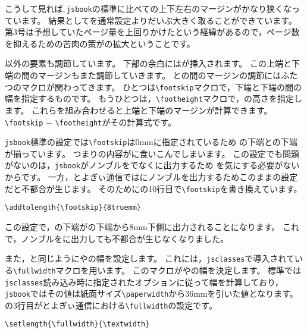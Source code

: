 こうして見れば,\,\verb|jsbook|の標準に比べての上下左右のマージンがかなり狭くなっています。
結果としてを通常設定よりだいぶ大きく取ることができています。
第3号は予想していたページ量を上回りかけたという経緯があるので，ページ数を抑えるための苦肉の策がの拡大ということです。

以外の要素も調節しています。
下部の余白にはが挿入されます。
この上端と下端の間のマージンもまた調節していきます。
との間のマージンの調節にはふたつのマクロが関わってきます。
ひとつは\verb|\footskip|マクロで，下端と下端の間の幅を指定するものです。
もうひとつは，\verb|\footheight|マクロで，の高さを指定します。
これらを組み合わせると上端と下端のマージンが計算できます。
\verb|\footskip| $-$ \verb|\footheight|がその計算式です。

\texttt{jsbook}標準の設定では\verb|\footskip|は0mmに指定されているため
の下端との下端が揃っています。
つまりの内容がに食いこんでしまいます。
この設定でも問題がないのは，\texttt{jsbook}がノンブルをでなくに出力するため
を気にする必要がないからです。
一方，とよぎぃ通信ではにノンブルを出力するためこのままの設定だと不都合が生じます。
そのためにの10行目で\verb|\footskip|を書き換えています。
\begin{verbatim}
\addtolength{\footskip}{8truemm}
\end{verbatim}

この設定で，の下端がの下端から8mm下側に出力されることになります。
これで，ノンブルをに出力しても不都合が生じなくなりました。

また，と同じようにやの幅を設定します。
これには，\texttt{jsclasses}で導入されている\verb|\fullwidth|マクロを用います。
このマクロがやの幅を決定します。
標準では\texttt{jsclasses}読み込み時に指定されたオプションに従って幅を計算しており，
\texttt{jsbook}ではその値は紙面サイズ\verb|\paperwidth|から36mmを引いた値となります。
の3行目がとよぎぃ通信における\verb|\fullwidth|の設定です。
\begin{verbatim}
\setlength{\fullwidth}{\textwidth}
\end{verbatim}

